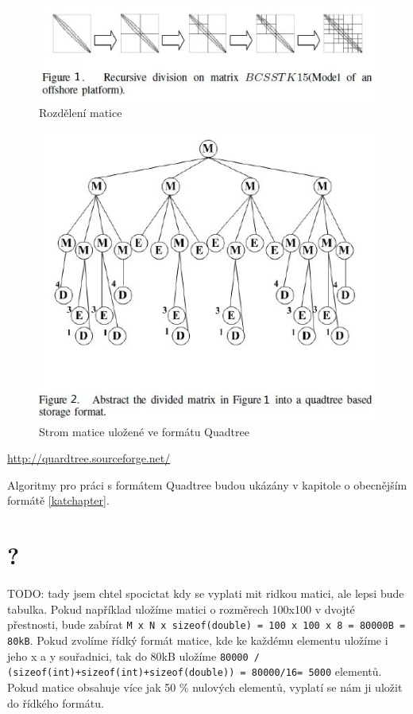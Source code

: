 \begin{figure}[H]\centering
	\includegraphics[width=\textwidth]{./images/quadtree_sourceforge/figure4}
	\caption{Rozdělení matice}
	\label{fig:BSR}
\end{figure}

\begin{figure}[H]\centering
	\includegraphics[width=\textwidth]{./images/quadtree_sourceforge/figure5}
	\caption{Strom matice uložené ve formátu Quadtree}
	\label{fig:BSR}
\end{figure}

\url{http://quardtree.sourceforge.net/}

Algoritmy pro práci s formátem Quadtree budou ukázány v kapitole o obecnějším formátě \ref{katchapter}.

\section{?}

TODO: tady jsem chtel spocictat kdy  se vyplati mit ridkou matici, ale lepsi bude tabulka. Pokud například uložíme matici o rozměrech 100x100 v dvojté přestnosti, bude zabírat \texttt{M x N x sizeof(double) = 100 x 100 x 8 = 80000B = 80kB}. Pokud zvolíme řídký formát matice, kde ke každému elementu uložíme i jeho x a y souřadnici, tak do 80kB uložíme \texttt{80000 / (sizeof(int)+sizeof(int)+sizeof(double)) = 80000/16= 5000} elementů. Pokud matice obsahuje více jak 50  \% nulových elementů, vyplatí se nám ji uložit do řídkého formátu.

